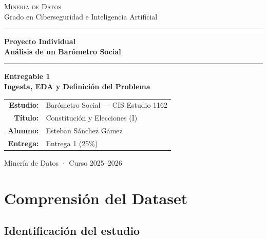 \documentclass[12pt,a4paper]{article}
\begin{document}
\begin{titlepage}
  \centering
  \vspace*{2cm}

  {\large\color{gray}\textsc{Minería de Datos}\\
  Grado en Ciberseguridad e Inteligencia Artificial}

  \vspace{1.5cm}
  {\color{primary}\rule{\linewidth}{1.5pt}}
  \vspace{0.4cm}

  {\Huge\bfseries\color{black} Proyecto Individual\\[0.3em]
  \Large Análisis de un Barómetro Social}

  \vspace{0.4cm}
  {\color{primary}\rule{\linewidth}{1.5pt}}

  \vspace{1cm}
  {\LARGE\bfseries\color{black}
  Entregable 1\\[0.2em]
  \large Ingesta, EDA y Definición del Problema}

  \vspace{2cm}
  \begin{tabular}{rl}
    \textbf{Estudio:}    & Barómetro Social --- CIS Estudio 1162 \\[4pt]
    \textbf{Título:}     & Constitución y Elecciones (I) \\[4pt]
    \textbf{Alumno:}     & Esteban Sánchez Gámez \\[4pt]
    \textbf{Entrega:}    & Entrega 1 (25\%) \\[4pt]
  \end{tabular}

  \vfill
  {\small\color{gray}Minería de Datos · Curso 2025--2026}
\end{titlepage}

\tableofcontents
\newpage

\section{Comprensión del Dataset}

\subsection{Identificación del estudio}
\end{document}
